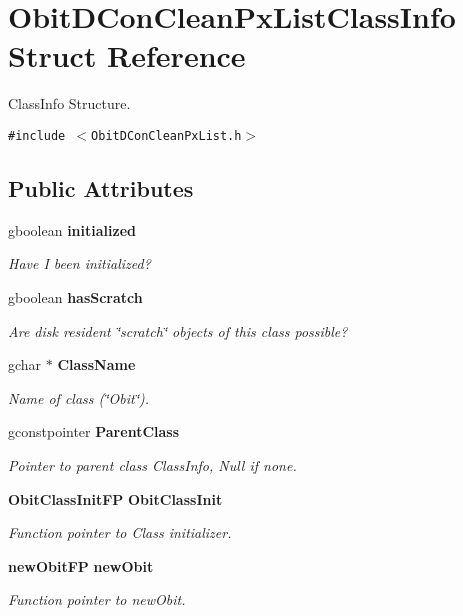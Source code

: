 \section{Obit\-DCon\-Clean\-Px\-List\-Class\-Info Struct Reference}
\label{structObitDConCleanPxListClassInfo}
Class\-Info Structure.  


{\tt \#include $<$Obit\-DCon\-Clean\-Px\-List.h$>$}

\subsection*{Public Attributes}
\begin{CompactItemize}
\item 
gboolean {\bf initialized}
\begin{CompactList}\small\item\em Have I been initialized? \item\end{CompactList}\item 
gboolean {\bf has\-Scratch}
\begin{CompactList}\small\item\em Are disk resident \char`\"{}scratch\char`\"{} objects of this class possible? \item\end{CompactList}\item 
gchar $\ast$ {\bf Class\-Name}
\begin{CompactList}\small\item\em Name of class (\char`\"{}Obit\char`\"{}). \item\end{CompactList}\item 
gconstpointer {\bf Parent\-Class}
\begin{CompactList}\small\item\em Pointer to parent class Class\-Info, Null if none. \item\end{CompactList}\item 
{\bf Obit\-Class\-Init\-FP} {\bf Obit\-Class\-Init}
\begin{CompactList}\small\item\em Function pointer to Class initializer. \item\end{CompactList}\item 
{\bf new\-Obit\-FP} {\bf new\-Obit}
\begin{CompactList}\small\item\em Function pointer to new\-Obit. \item\end{CompactList}\item 

\end{CompactItemize}
